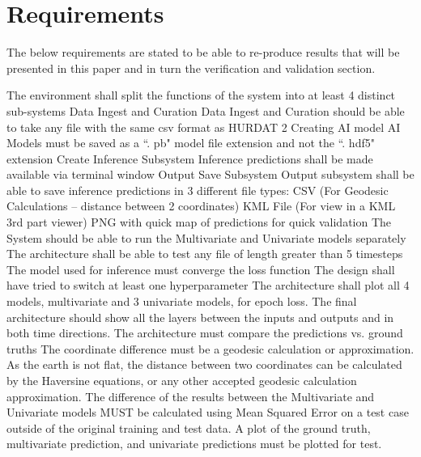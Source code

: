 \documentclass{article}
\begin{document}
\section{Requirements}
The below requirements are stated to be able to re-produce results that will be presented in this paper and in turn the verification and validation section.

The environment shall split the functions of the system into at least 4 distinct sub-systems
Data Ingest and Curation
Data Ingest and Curation should be able to take any file with the same csv format as HURDAT 2
Creating AI model
AI Models must be saved as a “. pb" model file extension and not the “. hdf5" extension
Create Inference Subsystem
Inference predictions shall be made available via terminal window
Output Save Subsystem
Output subsystem shall be able to save inference predictions in 3 different file types:
CSV (For Geodesic Calculations – distance between 2 coordinates)
KML File (For view in a KML 3rd part viewer)
PNG with quick map of predictions for quick validation
The System should be able to run the Multivariate and Univariate models separately
The architecture shall be able to test any file of length greater than 5 timesteps
The model used for inference must converge the loss function
The design shall have tried to switch at least one hyperparameter
The architecture shall plot all 4 models, multivariate and 3 univariate models, for epoch loss.
The final architecture should show all the layers between the inputs and outputs and in both time directions.
The architecture must compare the predictions vs. ground truths 
The coordinate difference must be a geodesic calculation or approximation.
As the earth is not flat, the distance between two coordinates can be calculated by the Haversine equations, or any other accepted geodesic calculation approximation.
The difference of the results between the Multivariate and Univariate models MUST be calculated using Mean Squared Error on a test case outside of the original training and test data.
 A plot of the ground truth, multivariate prediction, and univariate predictions must be plotted for test.
\end{document}
